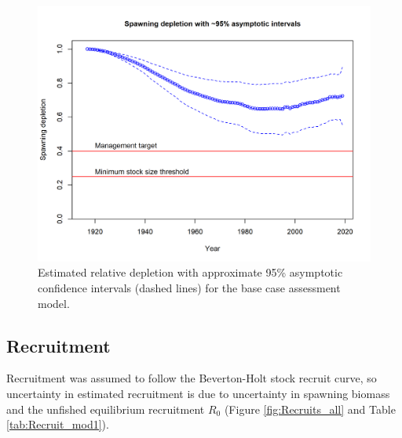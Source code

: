 \documentclass[12pt,]{article}
\begin{document}
\begin{figure}
\centering
\includegraphics{r4ss/plots_mod1/ts9_Spawning_depletion_with_95_asymptotic_intervals_intervals.png}
\caption{Estimated relative depletion with approximate 95\% asymptotic
confidence intervals (dashed lines) for the base case assessment model.
\label{fig:RelDeplete_all}}
\end{figure}

\FloatBarrier

\hypertarget{recruitment}{%
\subsection*{Recruitment}\label{recruitment}}

Recruitment was assumed to follow the Beverton-Holt stock recruit curve,
so uncertainty in estimated recruitment is due to uncertainty in
spawning biomass and the unfished equilibrium recruitment \(R_0\)
(Figure \ref{fig:Recruits_all} and Table \ref{tab:Recruit_mod1}).
\end{document}
